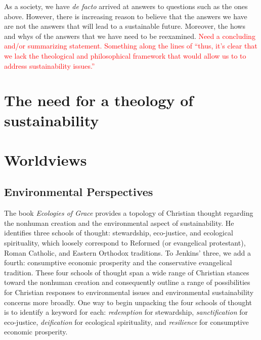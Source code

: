 \documentclass[12pt]{article}
\newcommand{\ins}[1]{\textcolor{red}{#1}}
\begin{document}
As a society, we have \emph{de facto} arrived at answers to questions such as the ones above. However, 
there is increasing reason to believe that the answers we have are not the answers that will lead to a sustainable future.
Moreover, the hows and whys of the answers that we have need to be reexamined.
\ins{Need a concluding and/or summarizing statement. Something along the lines of ``thus, it's clear that we lack the theological
and philosophical framework that would allow us to to address sustainability issues.''}



\section{The need for a theology of sustainability}
\label{sec:need_for_theology_of_sustainability}





\section{Worldviews}
\label{sec:worldviews}


\subsection{Environmental Perspectives}
\label{sec:environmental}

The book \emph{Ecologies of Grace} \autocite{Jenkins:2008}
provides a topology of Christian thought regarding the 
nonhuman creation and the
environmental aspect of sustainability.
He identifies three schools of thought:
stewardship, 
eco-justice, and 
ecological spirituality,
which loosely correspond to 
Reformed (or evangelical protestant), 
Roman Catholic, and 
Eastern Orthodox 
traditions.
To Jenkins' three, we add a fourth:
consumptive economic prosperity and
the conservative evangelical tradition. 
These four schools of thought 
span a wide range of Christian stances toward the nonhuman creation
and 
consequently outline a range of possibilities 
for Christian responses to environmental issues
and environmental sustainability concerns more broadly.
One way to begin unpacking the four schools of thought 
is to identify a keyword for each:
\emph{redemption} for stewardship, 
\emph{sanctification} for eco-justice,
\emph{deification} for ecological spirituality, and
\emph{resilience} for consumptive economic prosperity.
\end{document}

